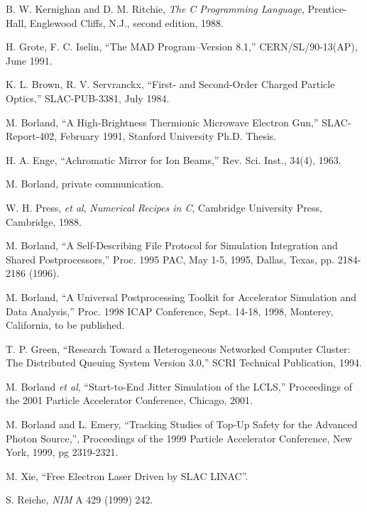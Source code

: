 \documentclass[11pt]{article}
\begin{document}
\begin{thebibliography}{9}

    B. W. Kernighan and D. M. Ritchie, {\em The C Programming Language},
    Prentice-Hall, Englewood Cliffs, N.J., second edition, 1988.

    H. Grote, F. C. Iselin, ``The MAD Program--Version 8.1,'' CERN/SL/90-13(AP), June 1991.

    K. L. Brown, R. V. Servranckx, ``First- and Second-Order Charged Particle Optics,'' 
    SLAC-PUB-3381, July 1984.

    M. Borland, ``A High-Brightness Thermionic Microwave Electron Gun,'' SLAC-Report-402,
    February 1991, Stanford University Ph.D. Thesis.

    H. A. Enge, ``Achromatic Mirror for Ion Beams,'' Rev. Sci. Inst., 34(4), 1963.

    M. Borland, private communication.

    W. H. Press, {\em et al}, {\em Numerical Recipes in C}, Cambridge University
    Press, Cambridge, 1988.

M. Borland, ``A Self-Describing File Protocol for Simulation
Integration and Shared Postprocessors,'' Proc. 1995 PAC, May 1-5,
1995, Dallas, Texas, pp. 2184-2186 (1996).

M. Borland, ``A Universal Postprocessing Toolkit for Accelerator 
Simulation and Data Analysis,'' Proc. 1998 ICAP Conference, 
Sept. 14-18, 1998, Monterey, California, to be published.

 T. P. Green, ``Research Toward a Heterogeneous Networked
Computer Cluster: The Distributed Queuing System Version 3.0,'' SCRI
Technical Publication, 1994.

 M. Borland {\em et al}, ``Start-to-End Jitter Simulation
of the LCLS,'' Proceedings of the 2001 Particle Accelerator Conference,
Chicago, 2001.

 M. Borland and L. Emery, ``Tracking Studies of
Top-Up Safety for the Advanced Photon Source,'', Proceedings of the
1999 Particle Accelerator Conference, New York, 1999, pg 2319-2321.

 M. Xie, ``Free Electron Laser Driven by SLAC
LINAC''.

 S. Reiche, {\em NIM} A 429 (1999) 242.


\end{thebibliography}
\end{document}
